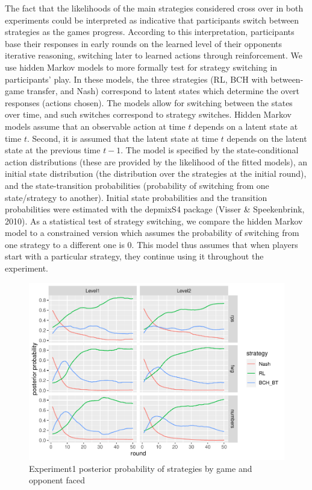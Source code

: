\documentclass[english,man,floatsintext]{apa6}
\begin{document}
The fact that the likelihoods of the main strategies considered cross over in both experiments could be interpreted as indicative that participants switch between strategies as the games progress. According to this interpretation, participants base their responses in early rounds on the learned level of their opponents iterative reasoning, switching later to learned actions through reinforcement.
We use hidden Markov models to more formally test for strategy switching in participants' play. In these models, the three strategies (RL, BCH with between-game transfer, and Nash) correspond to latent states which determine the overt responses (actions chosen). The models allow for switching between the states over time, and such switches correspond to strategy switches. Hidden Markov models assume that an observable action at time \(t\) depends on a latent state at time \(t\). Second, it is assumed that the latent state at time \(t\) depends on the latent state at the previous time \(t-1\). The model is specified by the state-conditional action distributions (these are provided by the likelihood of the fitted models), an initial state distribution (the distribution over the strategies at the initial round), and the state-transition probabilities (probability of switching from one state/strategy to another). Initial state probabilities and the transition probabilities were estimated with the depmixS4 package (Visser \& Speekenbrink, 2010). As a statistical test of strategy switching, we compare the hidden Markov model to a constrained version which assumes the probability of switching from one strategy to a different one is 0. This model thus assumes that when players start with a particular strategy, they continue using it throughout the experiment.

\begin{figure}

{\centering \includegraphics{paper_draft_2021_files/figure-latex/exp1-posteriors-plot-1} 

}

\caption{Experiment1 posterior probability of strategies by game and opponent faced}\label{fig:exp1-posteriors-plot}
\end{figure}
\end{document}
